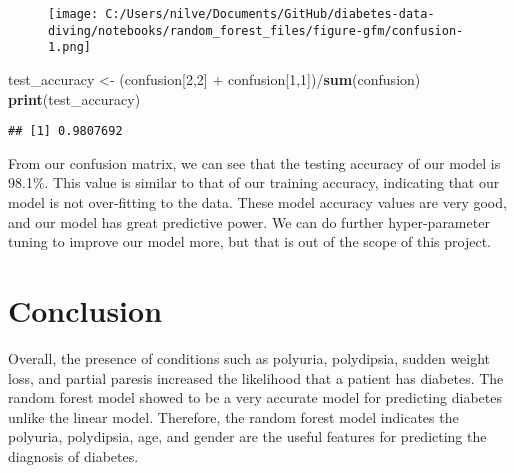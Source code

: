 \documentclass[
]{article}
\newenvironment{Shaded}{}{}
\newcommand{\DecValTok}[1]{\textcolor[rgb]{0.25,0.63,0.44}{#1}}
\newcommand{\KeywordTok}[1]{\textcolor[rgb]{0.00,0.44,0.13}{\textbf{#1}}}
\newcommand{\NormalTok}[1]{#1}
\newcommand{\OperatorTok}[1]{\textcolor[rgb]{0.40,0.40,0.40}{#1}}
\newcommand{\StringTok}[1]{\textcolor[rgb]{0.25,0.44,0.63}{#1}}
\begin{document}
\begin{figure}
\centering
\texttt{[image: C:/Users/nilve/Documents/GitHub/diabetes-data-diving/notebooks/random\_forest\_files/figure-gfm/confusion-1.png]}
\caption{}
\end{figure}

\begin{Shaded}
\begin{Highlighting}[]
\NormalTok{test_accuracy <-}\StringTok{ }\NormalTok{(confusion[}\DecValTok{2}\NormalTok{,}\DecValTok{2}\NormalTok{] }\OperatorTok{+}\StringTok{ }\NormalTok{confusion[}\DecValTok{1}\NormalTok{,}\DecValTok{1}\NormalTok{])}\OperatorTok{/}\KeywordTok{sum}\NormalTok{(confusion)}
\KeywordTok{print}\NormalTok{(test_accuracy)}
\end{Highlighting}
\end{Shaded}

\begin{verbatim}
## [1] 0.9807692
\end{verbatim}

From our confusion matrix, we can see that the testing accuracy of our
model is 98.1\%. This value is similar to that of our training accuracy,
indicating that our model is not over-fitting to the data. These model
accuracy values are very good, and our model has great predictive power.
We can do further hyper-parameter tuning to improve our model more, but
that is out of the scope of this project.

\hypertarget{header-n982}{%
\section{Conclusion}\label{header-n982}}

Overall, the presence of conditions such as polyuria, polydipsia, sudden
weight loss, and partial paresis increased the likelihood that a patient
has diabetes. The random forest model showed to be a very accurate model
for predicting diabetes unlike the linear model. Therefore, the random
forest model indicates the polyuria, polydipsia, age, and gender are the
useful features for predicting the diagnosis of diabetes.
\end{document}

